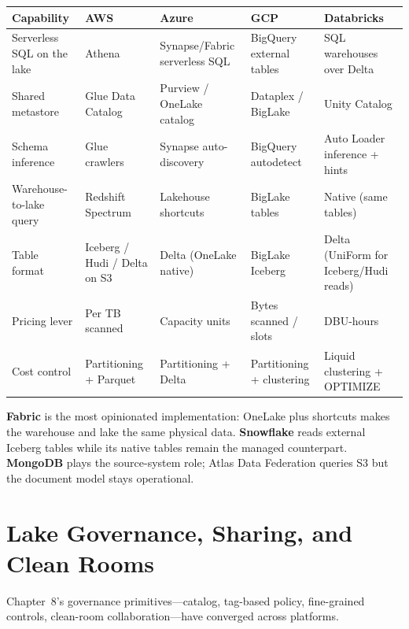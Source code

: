 \begin{center}
\footnotesize
\begin{tabular}{@{}p{2.4cm}p{2.9cm}p{2.9cm}p{2.9cm}p{2.9cm}@{}}
\toprule
\textbf{Capability} & \textbf{AWS} & \textbf{Azure} & \textbf{GCP} & \textbf{Databricks} \\
\midrule
Serverless SQL on the lake & Athena & Synapse/Fabric serverless SQL & BigQuery external tables & SQL warehouses over Delta \\
Shared metastore & Glue Data Catalog & Purview / OneLake catalog & Dataplex / BigLake & Unity Catalog \\
Schema inference & Glue crawlers & Synapse auto-discovery & BigQuery autodetect & Auto Loader inference + hints \\
Warehouse-to-lake query & Redshift Spectrum & Lakehouse shortcuts & BigLake tables & Native (same tables) \\
Table format & Iceberg / Hudi / Delta on S3 & Delta (OneLake native) & BigLake Iceberg & Delta (UniForm for Iceberg/Hudi reads) \\
\addlinespace
Pricing lever & Per TB scanned & Capacity units & Bytes scanned / slots & DBU-hours \\
Cost control & Partitioning + Parquet & Partitioning + Delta & Partitioning + clustering & Liquid clustering + OPTIMIZE \\
\bottomrule
\end{tabular}
\end{center}

\noindent \textbf{Fabric} is the most opinionated implementation: OneLake plus shortcuts makes the
warehouse and lake the same physical data. \textbf{Snowflake} reads external Iceberg tables while
its native tables remain the managed counterpart. \textbf{MongoDB} plays the source-system role;
Atlas Data Federation queries S3 but the document model stays operational.

\section{Lake Governance, Sharing, and Clean Rooms}
%
Chapter~8's governance primitives---catalog, tag-based policy, fine-grained controls, clean-room
collaboration---have converged across platforms.

